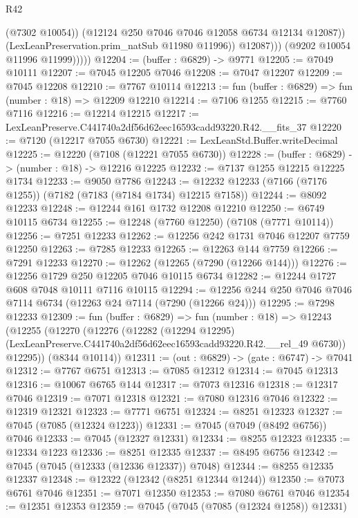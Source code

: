 \begin{lexlean}{R42}
\begin{coremodule}
{                        (@7302 @10054))
                      (@12124 @250 @7046 @7046 @12058 @6734 @12134 @12087))
                    (LexLeanPreservation.prim_natSub @11980 @11996))
                  @12087)))
            (@9202 @10054 @11996 @11999)))))
@12204 := (buffer : @6829) -> @9771
@12205 := @7049 @10111
@12207 := @7045 @12205 @7046
@12208 := @7047 @12207
@12209 := @7045 @12208
@12210 := @7767 @10114
@12213 := fun (buffer : @6829) => fun (number : @18) => @12209 @12210
@12214 := @7106 @1255
@12215 := @7760 @7116
@12216 := @12214 @12215
@12217 := LexLeanPreserve.C441740a2df56d62eec16593cadd93220.R42.__fits_37
@12220 := @7120 (@12217 @7055 @6730)
@12221 := LexLeanStd.Buffer.writeDecimal
@12225 := @12220 (@7108 (@12221 @7055 @6730))
@12228 := (buffer : @6829) -> (number : @18) -> @12216 @12225
@12232 := @7137 @1255 @12215 @12225 @1734
@12233 := @9050 @7786
@12243 := @12232 @12233 (@7166 (@7176 @1255)) (@7182 (@7183 (@7184 @1734) @12215 @7158))
@12244 := @8092 @12233
@12248 := @12244 @161 @1732 @12208 @12210
@12250 := @6749 @10115 @6734
@12255 := @12248 (@7760 @12250) (@7108 (@7771 @10114))
@12256 := @7251 @12233
@12262 := @12256 @242 @1731 @7046 @12207 @7759 @12250
@12263 := @7285 @12233
@12265 := @12263 @144 @7759
@12266 := @7291 @12233
@12270 := @12262 (@12265 (@7290 (@12266 @144)))
@12276 := @12256 @1729 @250 @12205 @7046 @10115 @6734
@12282 := @12244 @1727 @608 @7048 @10111 @7116 @10115
@12294 := @12256 @244 @250 @7046 @7046 @7114 @6734 (@12263 @24 @7114 (@7290 (@12266 @24)))
@12295 := @7298 @12233
@12309 := fun (buffer : @6829) =>
  fun (number : @18) =>
  @12243
    (@12255
      (@12270
        (@12276
          (@12282
            (@12294 @12295)
            (LexLeanPreserve.C441740a2df56d62eec16593cadd93220.R42.__rel_49 @6730))
          @12295))
      (@8344 @10114))
@12311 := (out : @6829) -> (gate : @6747) -> @7041
@12312 := @7767 @6751
@12313 := @7085 @12312
@12314 := @7045 @12313
@12316 := @10067 @6765 @144
@12317 := @7073 @12316
@12318 := @12317 @7046
@12319 := @7071 @12318
@12321 := @7080 @12316 @7046
@12322 := @12319 @12321
@12323 := @7771 @6751
@12324 := @8251 @12323
@12327 := @7045 (@7085 (@12324 @1223))
@12331 := @7045 (@7049 (@8492 @6756)) @7046
@12333 := @7045 (@12327 @12331)
@12334 := @8255 @12323
@12335 := @12334 @1223
@12336 := @8251 @12335
@12337 := @8495 @6756
@12342 := @7045 (@7045 (@12333 (@12336 @12337)) @7048)
@12344 := @8255 @12335 @12337
@12348 := @12322 (@12342 (@8251 @12344 @1244))
@12350 := @7073 @6761 @7046
@12351 := @7071 @12350
@12353 := @7080 @6761 @7046
@12354 := @12351 @12353
@12359 := @7045 (@7045 (@7085 (@12324 @1258)) @12331)
}
\end{coremodule}
\end{lexlean}
